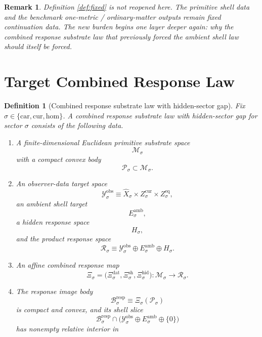 \documentclass[11pt]{article}
\newcommand{\Car}{\mathrm{car}}
\newcommand{\Cur}{\mathrm{cur}}
\newcommand{\Hom}{\mathrm{hom}}
\newcommand{\VisibleAffine}[1]{\widehat X_{#1}}
\newcommand{\DataSpace}[1]{\mathcal Y_{#1}^{\mathrm{obs}}}
\newcommand{\AmbientTarget}[1]{E_{#1}^{\mathrm{amb}}}
\newcommand{\ProtoSpace}[1]{\mathcal M_{#1}}
\newcommand{\ProtoBody}[1]{\mathcal P_{#1}}
\newcommand{\ResponseSpace}[1]{\mathcal R_{#1}}
\newcommand{\ResponseMap}[1]{\Xi_{#1}}
\newcommand{\ResponseData}[1]{\Xi_{#1}^{\mathrm{dat}}}
\newcommand{\ResponseShell}[1]{\Xi_{#1}^{\mathrm{sh}}}
\newcommand{\ResponseHidden}[1]{\Xi_{#1}^{\mathrm{hid}}}
\newcommand{\ResponseImage}[1]{\mathcal B_{#1}^{\mathrm{resp}}}
\newcommand{\GapSpace}[1]{H_{#1}}
\newtheorem{definition}{Definition}
\newtheorem{remark}{Remark}
\begin{document}
\begin{remark}
Definition \ref{def:fixed} is not reopened here. The primitive shell data and the benchmark one-metric / ordinary-matter outputs remain fixed continuation data. The new burden begins one layer deeper again: why the combined response substrate law that previously forced the ambient shell law should itself be forced.
\end{remark}

\section{Target Combined Response Law}

\begin{definition}[Combined response substrate law with hidden-sector gap]
\label{def:combined}
Fix \(\sigma\in\{\Car,\Cur,\Hom\}\). A \emph{combined response substrate law with hidden-sector gap} for sector \(\sigma\) consists of the following data.
\begin{enumerate}
    \item A finite-dimensional Euclidean primitive substrate space
    \[
    \ProtoSpace{\sigma}
    \]
    with a compact convex body
    \[
    \ProtoBody{\sigma}\subset \ProtoSpace{\sigma}.
    \]
    \item An observer-data target space
    \[
    \DataSpace{\sigma}
    \equiv
    \VisibleAffine{\sigma}\times Z_{\sigma}^{\mathrm{cur}}\times Z_{\sigma}^{\mathrm{eq}},
    \]
    an ambient shell target
    \[
    \AmbientTarget{\sigma},
    \]
    a hidden response space
    \[
    \GapSpace{\sigma},
    \]
    and the product response space
    \[
    \ResponseSpace{\sigma}
    \equiv
    \DataSpace{\sigma}\oplus \AmbientTarget{\sigma}\oplus \GapSpace{\sigma}.
    \]
    \item An affine combined response map
    \[
    \ResponseMap{\sigma}
    =
    \bigl(
    \ResponseData{\sigma},
    \ResponseShell{\sigma},
    \ResponseHidden{\sigma}
    \bigr):
    \ProtoSpace{\sigma}\to \ResponseSpace{\sigma}.
    \]
    \item The response image body
    \begin{equation}
    \ResponseImage{\sigma}
    \equiv
    \ResponseMap{\sigma}(\ProtoBody{\sigma})
    \label{eq:imagebody}
    \end{equation}
    is compact and convex, and its shell slice
    \[
    \ResponseImage{\sigma}\cap
    \bigl(
    \DataSpace{\sigma}\oplus \AmbientTarget{\sigma}\oplus\{0\}
    \bigr)
    \]
    has nonempty relative interior in

\end{enumerate}
\end{definition}
\end{document}
